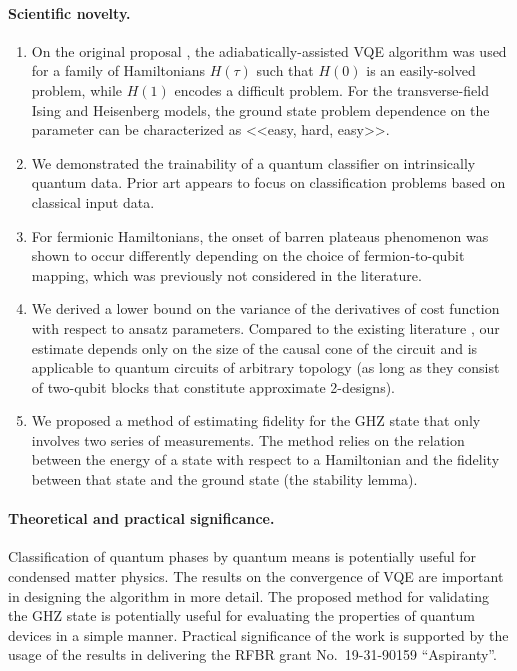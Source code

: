 \paragraph{Scientific novelty.}
\begin{enumerate}
    \item On the original proposal \cite{garcia-saez_addressing_2018}, the adiabatically-assisted VQE algorithm was used for a family of Hamiltonians $H(\tau)$ such that $H(0)$ is an easily-solved problem, while $H(1)$ encodes a difficult problem. For the transverse-field Ising and Heisenberg models, the ground state problem dependence on the parameter can be characterized as <<easy, hard, easy>>. 
    \item We demonstrated the trainability of a quantum classifier on intrinsically quantum data. Prior art appears to focus on classification problems based on classical input data.    
    \item For fermionic Hamiltonians, the onset of barren plateaus phenomenon was shown to occur differently depending on the choice of fermion-to-qubit mapping, which was previously not considered in the literature.
    \item We derived a lower bound on the variance of the derivatives of cost function with respect to ansatz parameters. Compared to the existing literature \cite{mcclean_barren_2018,cerezo_cost-function-dependent_2020}, our estimate depends only on the size of the causal cone of the circuit and is applicable to quantum circuits of arbitrary topology (as long as they consist of two-qubit blocks that constitute approximate 2-designs).
    \item We proposed a method of estimating fidelity for the GHZ state that only involves two series of measurements. The method relies on the relation between the energy of a state with respect to a Hamiltonian and the fidelity between that state and the ground state (the stability lemma).
\end{enumerate}

\paragraph{Theoretical and practical significance.} Classification of quantum phases by quantum means is potentially useful for condensed matter physics. The results on the convergence of VQE are important in designing the algorithm in more detail. The proposed method for validating the GHZ state is potentially useful for evaluating the properties of quantum devices in a simple manner.
Practical significance of the work is supported by the usage of the results in delivering the RFBR grant No.\ 19-31-90159 ``Aspiranty''.

